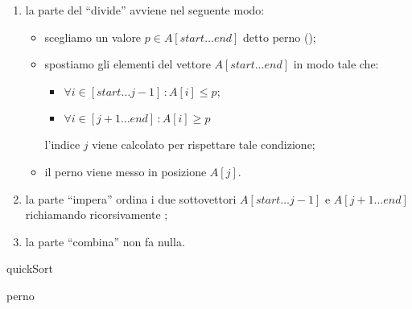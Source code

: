 \medskip
\begin{enumerate}
	\item la parte del \enquote{divide} avviene nel seguente modo:
	\begin{itemize}
		\item scegliamo un valore \(p \in A[start \dots end]\) detto perno ();
		\item spostiamo gli elementi del vettore \(A[start \dots end]\) in modo tale che:
		\begin{itemize}
			\item \(\forall i \in [start \dots j-1]\,:A[i] \leqslant p\);
			\item \(\forall i \in [j+1 \dots end]\,:A[i] \geqslant p\)
		\end{itemize}
		l'indice \(j\) viene calcolato per rispettare tale condizione;
		\item il perno viene messo in posizione \(A[j]\).
	\end{itemize}
	\item la parte \enquote{impera} ordina i due sottovettori \(A[start \dots j-1]\) e \(A[j+1 \dots end]\) richiamando ricorsivamente \quickSort;
	\item la parte \enquote{combina} non fa nulla.
\end{enumerate}

\begin{algorithm}[H]
\caption{quickSort}

\end{algorithm}

\clearpage
\begin{algorithm}[H]
\caption{perno}

\end{algorithm}


